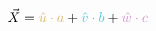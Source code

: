 \documentclass[preview]{standalone}
\begin{document}
$$\vec{X} = \textcolor[HTML]{d7b760}{\hat{u}\cdot a} + \textcolor[HTML]{46c6d9}{\hat{v}\cdot b} + \textcolor[HTML]{d290cd}{\hat{w}\cdot c}$$
\end{document}
